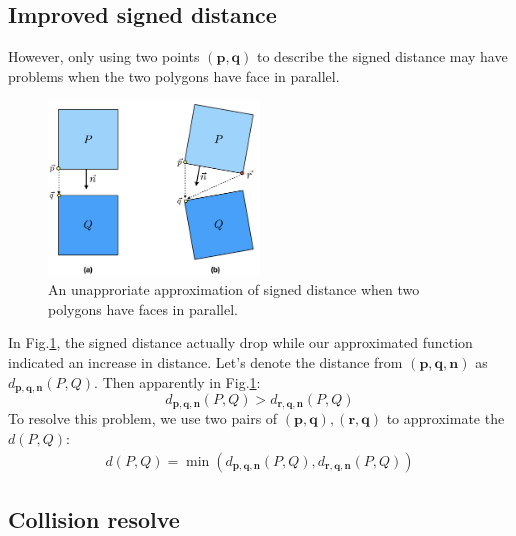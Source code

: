 \documentclass[12pt]{article}
\newcommand{\bn}{\mathbf{n}}
\newcommand{\bq}{\mathbf{q}}
\newcommand{\bp}{\mathbf{p}}
\newcommand{\br}{\mathbf{r}}
\begin{document}
\subsection{Improved signed distance}
However, only using two points $(\bp, \bq)$ to describe the signed distance may have problems when the two polygons have face in parallel. \\
\begin{figure}[!htbp]
  \centering
    \includegraphics[width=0.5\textwidth]{ppt/problem_distance.png}
      \caption{An unapproriate approximation of signed distance when two polygons have faces in parallel.}
      \label{fig:problem_distance}
     \end{figure}
In Fig.\ref{fig:problem_distance}, the signed distance actually drop while our approximated function indicated an increase in distance. Let's denote the distance from $(\bp, \bq, \bn)$ as $d_{\bp, \bq, \bn}(P, Q)$. Then apparently in Fig.\ref{fig:problem_distance}:
\begin{equation} 
	d_{\bp, \bq, \bn}(P, Q) >  d_{\br, \bq, \bn}(P, Q)
\end{equation}
To resolve this problem, we use two pairs of $(\bp, \bq), (\br, \bq)$ to approximate the $d(P, Q)$:
\begin{align} 
	d(P, Q)   = \min(d_{\bp, \bq, \bn}(P, Q) , d_{\br, \bq, \bn}(P, Q))
\end{align}
\subsection{Collision resolve} 
\end{document}
